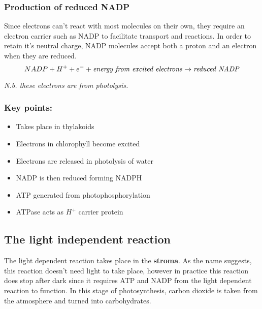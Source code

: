 \documentclass{article}
\begin{document}
\newpage
\subsubsection*{Production of reduced NADP}
Since electrons can't react with most molecules on their own, they require an
electron carrier such as NADP to facilitate transport and reactions. In order to
retain it's neutral charge, NADP molecules accept both a proton and an electron
when they are reduced.
\[
	NADP + H^+ + e^- +\textrm{\textit{energy from excited electrons}}\rightarrow
	\textrm{\textit{reduced NADP}}
\]

\textit{N.b. these electrons are from photolysis.}

\subsubsection*{Key points:}
\begin{itemize}
    \item Takes place in thylakoids
    \item Electrons in chlorophyll become excited
    \item Electrons are released in photolysis of water
    \item NADP is then reduced forming NADPH
    \item ATP generated from photophosphorylation
		\item ATPase acts as $H^+$ carrier protein
\end{itemize}

\newpage
\subsection*{The light independent reaction}
The light dependent reaction takes place in the \textbf{stroma}. As the name
suggests, this reaction doesn't need light to take place, however in practice
this reaction does stop after dark since it requires ATP and NADP from the light
dependent reaction to function. In this stage of photosynthesis, carbon dioxide
is taken from the atmosphere and turned into carbohydrates.
\end{document}
